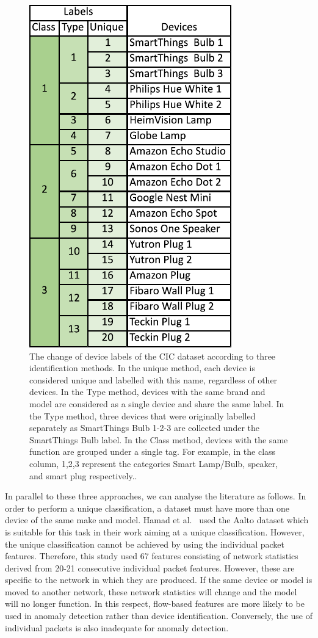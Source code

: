 \documentclass[journal]{IEEEtran}
\begin{document}
\begin{figure}[ht]
	\centerline{\includegraphics[width=0.61\columnwidth]{images/class.pdf}}
	\caption{The change of device labels of the CIC dataset according to three identification methods. In the unique method, each device is considered unique and labelled with this name, regardless of other devices. In the Type method, devices with the same brand and model are considered as a single device and share the same label. In the Type method, three devices that were originally labelled separately as SmartThings Bulb 1-2-3 are collected under the SmartThings Bulb label. In the Class method, devices with the same function are grouped under a single tag. For example, in the class column, 1,2,3 represent the categories Smart Lamp/Bulb, speaker, and smart plug respectively..}
	\label{fig:3aproach}
\end{figure}

In parallel to these three approaches, we can analyse the literature as follows. In order to perform a unique classification, a dataset must have more than one device of the same make and model. Hamad et al.\@~\cite{hamad2019iot} used the Aalto dataset which is suitable for this task in their work aiming at a unique classification. However, the unique classification cannot be achieved by using the individual packet features.   Therefore, this study used 67 features consisting of network statistics derived from 20-21 consecutive individual packet features. However, these are specific to the network in which they are produced.  If the same device or model is moved to another network, these network statistics will change and the model will no longer function. In this respect, flow-based features are more likely to be used in anomaly detection rather than device identification. Conversely, the use of individual packets is also inadequate for anomaly detection\cite{kostas2023AD}.
\end{document}
